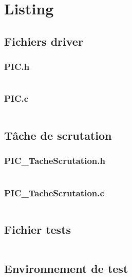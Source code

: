
\section{Listing}

\subsection{Fichiers driver}

\subsubsection{PIC.h}
\inputminted[tabsize=4,linenos=true,fontsize=\footnotesize,frame=single,resetmargins=true]{c}{\SRCPATH/PIC.h}

\subsubsection{PIC.c}
\inputminted[tabsize=4,linenos=true,fontsize=\footnotesize,frame=single,resetmargins=true]{c}{\SRCPATH/PIC.c}
\pagebreak

\subsection{Tâche de scrutation}

\subsubsection{PIC\_TacheScrutation.h}
\inputminted[tabsize=4,linenos=true,fontsize=\footnotesize,frame=single,resetmargins=true]{c}{\SRCPATH/PIC_TacheScrutation.h}

\subsubsection{PIC\_TacheScrutation.c}
\inputminted[tabsize=4,linenos=true,fontsize=\footnotesize,frame=single,resetmargins=true]{c}{\SRCPATH/PIC_TacheScrutation.c}
\pagebreak

\subsection{Fichier tests}

\inputminted[tabsize=4,linenos=true,fontsize=\footnotesize,frame=single,resetmargins=true]{c}{\SRCPATH/main.c}
\pagebreak

\subsection{Environnement de test}

